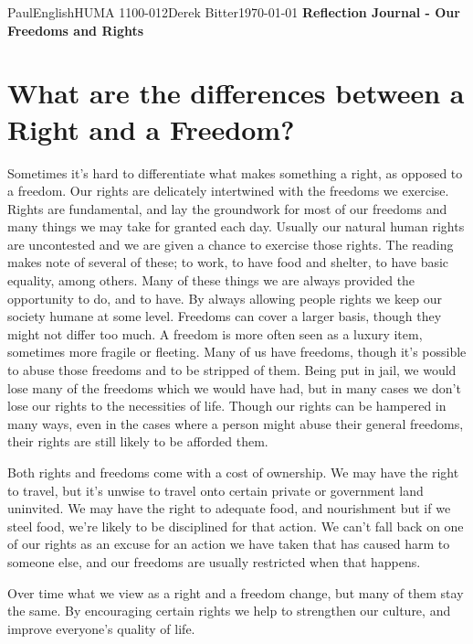 \documentclass[12pt,letterpaper]{article}
\begin{document}
\begin{mla}{Paul}{English}{HUMA 1100-012}{Derek
    Bitter}{\today}    
    {\textbf{Reflection Journal - Our Freedoms and Rights}}

\section*{What are the differences between a Right and a Freedom?}

Sometimes it's hard to differentiate what makes something a right, as opposed to a freedom. Our rights are delicately intertwined with the freedoms we exercise. Rights are fundamental, and lay the groundwork for most of our freedoms and many things we may take for granted each day. Usually our natural human rights are uncontested and we are given a chance to exercise those rights. The reading makes note of several of these; to work, to have food and shelter, to have basic equality, among others. Many of these things we are always provided the opportunity to do, and to have. By always allowing people rights we keep our society humane at some level. Freedoms can cover a larger basis, though they might not differ too much. A freedom is more often seen as a luxury item, sometimes more fragile or fleeting. Many of us have freedoms, though it's possible to abuse those freedoms and to be stripped of them. Being put in jail, we would lose many of the freedoms which we would have had, but in many cases we don't lose our rights to the necessities of life. Though our rights can be hampered in many ways, even in the cases where a person might abuse their general freedoms, their rights are still likely to be afforded them. 

Both rights and freedoms come with a cost of ownership. We may have the right to travel, but it's unwise to travel onto certain private or government land uninvited. We may have the right to adequate food, and nourishment but if we steel food, we're likely to be disciplined for that action. We can't fall back on one of our rights as an excuse for an action we have taken that has caused harm to someone else, and our freedoms are usually restricted when that happens.

Over time what we view as a right and a freedom change, but many of them stay the same. By encouraging certain rights we help to strengthen our culture, and improve everyone's quality of life.


\end{mla}
\end{document}
